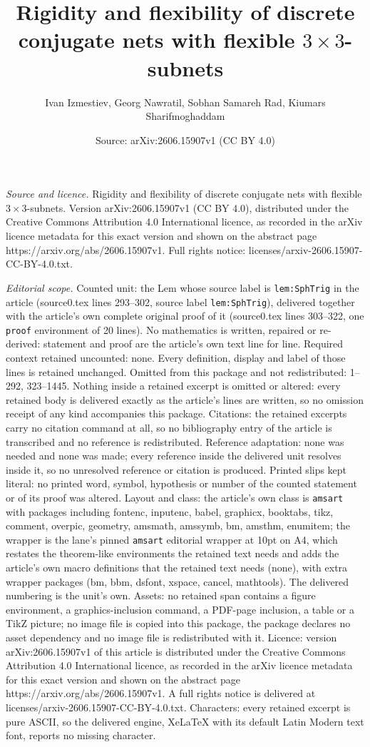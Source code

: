 \documentclass[10pt,a4paper]{amsart}
\title[Rigidity and flexibility of discrete conjugate nets with fle]{Rigidity and flexibility of discrete conjugate nets with flexible $3 \times 3$-subnets}
\author{Ivan Izmestiev, Georg Nawratil, Sobhan Samareh Rad, Kiumars Sharifmoghaddam}
\date{Source: arXiv:2606.15907v1 (CC BY 4.0)}
\begin{document}
\maketitle

\noindent\emph{Source and licence.} Rigidity and flexibility of discrete conjugate nets with flexible $3 \times 3$-subnets. Version arXiv:2606.15907v1 (CC BY 4.0), distributed under the Creative Commons Attribution 4.0 International licence, as recorded in the arXiv licence metadata for this exact version and shown on the abstract page https://arxiv.org/abs/2606.15907v1. Full rights notice: licenses/arxiv-2606.15907-CC-BY-4.0.txt.\par\smallskip

\noindent\textit{Editorial scope.} Counted unit: the Lem whose source label is \texttt{lem:SphTrig} in the article (source0.tex lines 293--302, source label \texttt{lem:SphTrig}), delivered together with the article's own complete original proof of it (source0.tex lines 303--322, one \texttt{proof} environment of 20 lines). No mathematics is written, repaired or re-derived: statement and proof are the article's own text line for line. Required context retained uncounted: none. Every definition, display and label of those lines is retained unchanged. Omitted from this package and not redistributed: 1--292, 323--1445. Nothing inside a retained excerpt is omitted or altered: every retained body is delivered exactly as the article's lines are written, so no omission receipt of any kind accompanies this package. Citations: the retained excerpts carry no citation command at all, so no bibliography entry of the article is transcribed and no reference is redistributed. Reference adaptation: none was needed and none was made; every reference inside the delivered unit resolves inside it, so no unresolved reference or citation is produced. Printed slips kept literal: no printed word, symbol, hypothesis or number of the counted statement or of its proof was altered. Layout and class: the article's own class is \texttt{amsart} with packages including fontenc, inputenc, babel, graphicx, booktabs, tikz, comment, overpic, geometry, amsmath, amssymb, bm, amsthm, enumitem; the wrapper is the lane's pinned \texttt{amsart} editorial wrapper at 10pt on A4, which restates the theorem-like environments the retained text needs and adds the article's own macro definitions that the retained text needs (none), with extra wrapper packages (bm, bbm, dsfont, xspace, cancel, mathtools). The delivered numbering is the unit's own. Assets: no retained span contains a figure environment, a graphics-inclusion command, a PDF-page inclusion, a table or a TikZ picture; no image file is copied into this package, the package declares no asset dependency and no image file is redistributed with it. Licence: version arXiv:2606.15907v1 of this article is distributed under the Creative Commons Attribution 4.0 International licence, as recorded in the arXiv licence metadata for this exact version and shown on the abstract page https://arxiv.org/abs/2606.15907v1. A full rights notice is delivered at licenses/arxiv-2606.15907-CC-BY-4.0.txt. Characters: every retained excerpt is pure ASCII, so the delivered engine, XeLaTeX with its default Latin Modern text font, reports no missing character.
\end{document}
